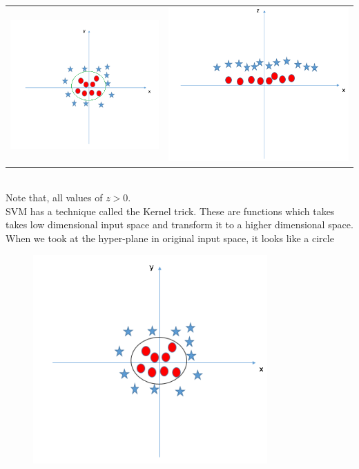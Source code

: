 \documentclass[a4paper,12pt]{report}
\begin{document}
\begin{appendices}
\begin{itemize}
\begin{tabular}{ll}
\includegraphics[totalheight=3 cm]{SVM_8.png} & \includegraphics[totalheight=3 cm]{SVM_9.png} \\
\end{tabular}
\\
Note that, all values of $z > 0$. \\
SVM has a technique called the Kernel trick. These are functions which takes takes  low dimensional input space and transform it to a higher dimensional space.
When we took at the hyper-plane in original input space, it looks like a circle
\begin{figure}[H]
	\centering
        \includegraphics[totalheight=4 cm]{SVM_10.png}

\end{figure}
\end{itemize}
\end{appendices}
\end{document}
